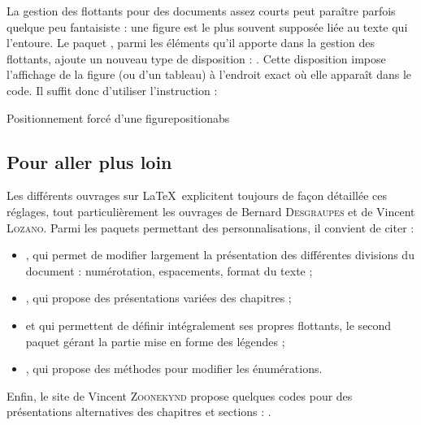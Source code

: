 La gestion des flottants pour des documents assez courts peut paraître parfois quelque peu fantaisiste : une figure est le plus souvent supposée liée au texte qui l'entoure. Le paquet , parmi les éléments qu'il apporte dans la gestion des flottants, ajoute un nouveau type de  disposition : . Cette disposition impose l'affichage de la figure (ou d'un tableau) à l'endroit exact où elle apparaît dans le code. Il suffit donc d'utiliser l'instruction :

\begin{codesimple}{Positionnement forcé d'une figure}{positionabs}
\begin{figure}[H] 
\end{figure} 
\end{codesimple}

\subsection{Pour aller plus loin}

Les différents ouvrages sur \LaTeX\ explicitent toujours de façon détaillée ces réglages, tout particulièrement les ouvrages de Bernard \textsc{Desgraupes}\cite{desg} et de Vincent \textsc{Lozano}\cite{loza}.
Parmi les paquets permettant des personnalisations, il convient de citer :
\begin{itemize}
\item {}, qui permet de modifier largement la présentation des différentes divisions du document : numérotation, espacements, format du texte ;
\item {}, qui propose des présentations variées des chapitres ;
\item {} et  qui permettent de définir intégralement ses propres flottants, le second paquet gérant la partie mise en forme des légendes ;
\item {}, qui propose des méthodes pour modifier les énumérations. 
\end{itemize}
Enfin, le site de Vincent \textsc{Zoonekynd} propose quelques codes pour des présentations alternatives des chapitres et sections : .
